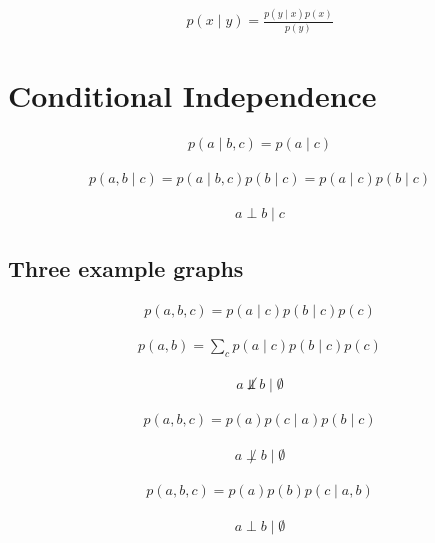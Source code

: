 \documentclass{article}
\begin{document}
\begin{align*}
p(x \mid y)=\frac{p(y \mid x) p(x)}{p(y)}
\tag{11.22}
\end{align*}


\section{Conditional Independence}

\begin{align*}
p(a \mid b, c)=p(a \mid c) 
\tag{11.22}
\end{align*}

\begin{align*}
p(a, b \mid c) = p(a \mid b, c) p(b \mid c) = p(a \mid c) p(b \mid c) 
\tag{11.23}
\end{align*}

\begin{align*}
a \perp b \mid c 
\tag{11.24}
\end{align*}

\subsection{Three example graphs}

\begin{align*}
p(a, b, c)=p(a \mid c) p(b \mid c) p(c) 
\tag{11.25}
\end{align*}

\begin{align*}
p(a, b)=\sum_{c} p(a \mid c) p(b \mid c) p(c) 
\tag{11.26}
\end{align*}

\begin{align*}
a \not \Perp b \mid \emptyset 
\tag{11.27}
\end{align*}

\begin{align*}
p(a, b, c)=p(a) p(c \mid a) p(b \mid c) 
\tag{11.28}
\end{align*}

\begin{align*}
a \not \perp b \mid \emptyset 
\tag{11.29}
\end{align*}

\begin{align*}
p(a, b, c)=p(a) p(b) p(c \mid a, b) 
\tag{11.30}
\end{align*}

\begin{align*}
a \perp b \mid \emptyset 
\tag{11.31}
\end{align*}
\end{document}
